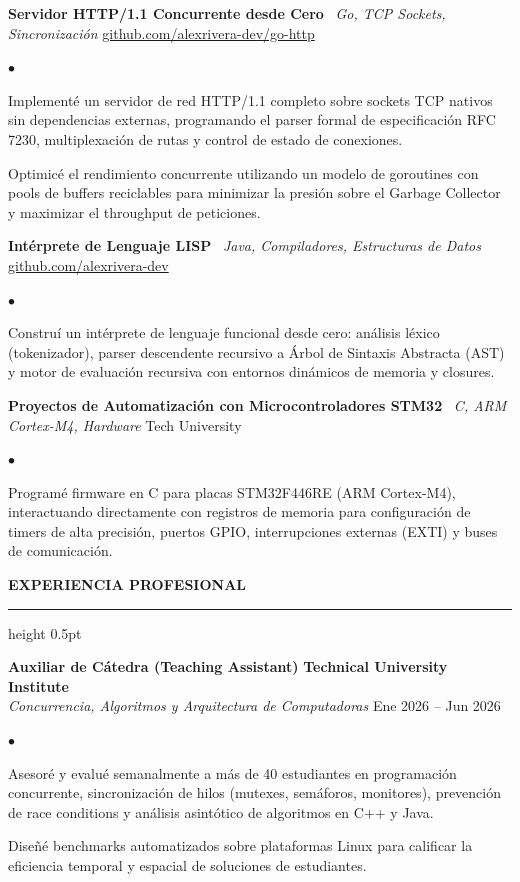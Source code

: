 \documentclass[10pt,letterpaper]{article}
\newcommand{\resumesection}[1]{%
  \vspace{2pt}%
  {\color{primary}\normalsize\bfseries\MakeUppercase{#1}}%
  \vspace{1pt}\hrule height 0.5pt\vspace{2pt}%
}
\renewenvironment{itemize}{%
  \begin{list}{\color{primary}$\bullet$}{%
    \setlength{\leftmargin}{1.1em}%
    \setlength{\itemsep}{0.5pt}%
    \setlength{\topsep}{1pt}%
    \setlength{\parsep}{0pt}%
    \setlength{\partopsep}{0pt}%
  }%
}{%
  \end{list}%
}
\begin{document}
\vspace{1.5pt}

\textbf{Servidor HTTP/1.1 Concurrente desde Cero} \textbar\ \textit{Go, TCP Sockets, Sincronización} \hfill \href{https://github.com/alexrivera-dev/go-http}{github.com/alexrivera-dev/go-http}
\begin{itemize}
    \item Implementé un servidor de red HTTP/1.1 completo sobre sockets TCP nativos sin dependencias externas, programando el parser formal de especificación RFC 7230, multiplexación de rutas y control de estado de conexiones.
    \item Optimicé el rendimiento concurrente utilizando un modelo de goroutines con pools de buffers reciclables para minimizar la presión sobre el Garbage Collector y maximizar el throughput de peticiones.
\end{itemize}

\vspace{1.5pt}

\textbf{Intérprete de Lenguaje LISP} \textbar\ \textit{Java, Compiladores, Estructuras de Datos} \hfill \href{https://github.com/alexrivera-dev}{github.com/alexrivera-dev}
\begin{itemize}
    \item Construí un intérprete de lenguaje funcional desde cero: análisis léxico (tokenizador), parser descendente recursivo a Árbol de Sintaxis Abstracta (AST) y motor de evaluación recursiva con entornos dinámicos de memoria y closures.
\end{itemize}

\vspace{1.5pt}

\textbf{Proyectos de Automatización con Microcontroladores STM32} \textbar\ \textit{C, ARM Cortex-M4, Hardware} \hfill Tech University
\begin{itemize}
    \item Programé firmware en C para placas STM32F446RE (ARM Cortex-M4), interactuando directamente con registros de memoria para configuración de timers de alta precisión, puertos GPIO, interrupciones externas (EXTI) y buses de comunicación.
\end{itemize}

\resumesection{Experiencia Profesional}

\textbf{Auxiliar de Cátedra (Teaching Assistant)} \hfill \textbf{Technical University Institute} \\
\textit{Concurrencia, Algoritmos y Arquitectura de Computadoras} \hfill Ene 2026 -- Jun 2026
\begin{itemize}
    \item Asesoré y evalué semanalmente a más de 40 estudiantes en programación concurrente, sincronización de hilos (mutexes, semáforos, monitores), prevención de race conditions y análisis asintótico de algoritmos en C++ y Java.
    \item Diseñé benchmarks automatizados sobre plataformas Linux para calificar la eficiencia temporal y espacial de soluciones de estudiantes.
\end{itemize}
\end{document}
